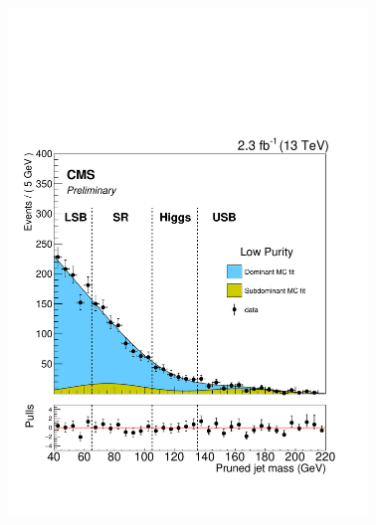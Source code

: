 \begin{figure}[!ht]
\begin{center}
  \includegraphics[width=270pt]{figuresARC/Vjets/dataMjUBLP.pdf}
\end{center}
\label{fig:fitprunedLP}
\end{figure}

